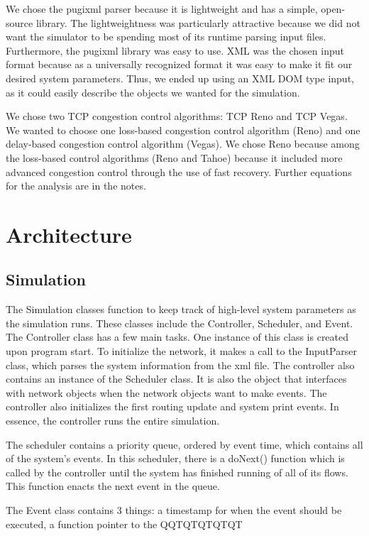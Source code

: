 \documentclass{article}
\begin{document}
    We chose the pugixml parser because it is lightweight and has a simple, open-source library. The lightweightness was particularly attractive because we did not want the simulator to be spending most of its runtime parsing input files. Furthermore, the pugixml library was easy to use. XML was the chosen input format because as a universally recognized format it was easy to make it fit our desired system parameters. Thus, we ended up using an XML DOM type input, as it could easily describe the objects we wanted for the simulation.

    We chose two TCP congestion control algorithms: TCP Reno and TCP Vegas. We wanted to choose one loss-based congestion control algorithm (Reno) and one delay-based congestion control algorithm (Vegas). We chose Reno because among the loss-based control algorithms (Reno and Tahoe) because it included more advanced congestion control through the use of fast recovery. Further equations for the analysis are in the notes.


\section{Architecture}

\subsection{Simulation}
    The Simulation classes function to keep track of high-level system parameters as the simulation runs. These classes include the Controller, Scheduler, and Event.
The Controller class has a few main tasks. One instance of this class is created upon program start. To initialize the network, it makes a call to the InputParser class, which parses the system information from the xml file. The controller also contains an instance of the Scheduler class. It is also the object that interfaces with network objects when the network objects want to make events. The controller also initializes the first routing update and system print events. In essence, the controller runs the entire simulation.

The scheduler contains a priority queue, ordered by event time, which contains all of the system’s events. In this scheduler, there is a doNext() function which is called by the controller until the system has finished running of all of its flows. This function enacts the next event in the queue. 

The Event class contains 3 things: a timestamp for when the event should be executed, a function pointer to the QQTQTQTQTQT
\end{document}
